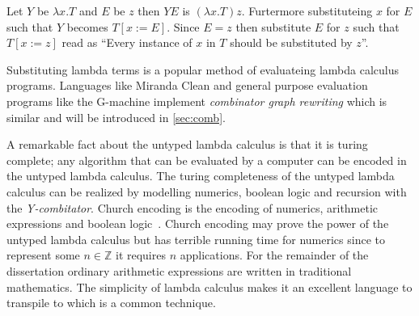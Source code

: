 \documentclass[11pt,oneside,a4paper]{report}
\begin{document}
\begin{exmp}
\label{ex:application}
Let $Y$ be $\lambda x . T$ and $E$ be $z$ then $Y E$ is $(\lambda x . T) z$.
Furtermore substituteing $x$ for $E$ such that $Y$ becomes $T[x := E]$.
Since $E = z$ then substitute $E$ for $z$ such that $T[x := z]$ read as ``Every instance of $x$ in $T$ should be substituted by $z$''.
\end{exmp}
\begin{remark}
Substituting lambda terms is a popular method of evaluateing lambda calculus programs.
Languages like Miranda Clean and general purpose evaluation programs like the G-machine implement \textit{combinator graph rewriting} which is similar and will be introduced in \autoref{sec:comb}.
\end{remark}

A remarkable fact about the untyped lambda calculus is that it is turing complete; any algorithm that can be evaluated by a computer can be encoded in the untyped lambda calculus.
The turing completeness of the untyped lambda calculus can be realized by modelling numerics, boolean logic and recursion with the \textit{Y-combitator}.
Church encoding is the encoding of numerics, arithmetic expressions and boolean logic~\cite{church1985calculi}.
Church encoding may prove the power of the untyped lambda calculus but has terrible running time for numerics since to represent some $n \in \mathbb{Z}$ it requires $n$ applications.
For the remainder of the dissertation ordinary arithmetic expressions are written in traditional mathematics.
The simplicity of lambda calculus makes it an excellent language to transpile to which is a common technique.
\end{document}

